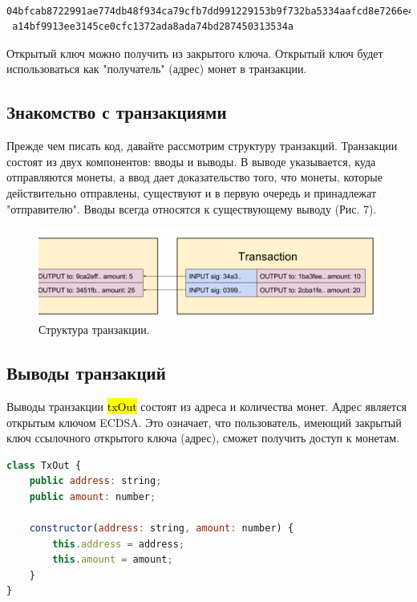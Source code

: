 \documentclass{article}
\begin{document}
\begin{lstlisting}
 04bfcab8722991ae774db48f934ca79cfb7dd991229153b9f732ba5334aafcd8e7266e47076996b55
 a14bf9913ee3145ce0cfc1372ada8ada74bd287450313534a
\end{lstlisting}

Открытый ключ можно получить из закрытого ключа. Открытый ключ будет использоваться как "получатель" (адрес) монет в транзакции.

\subsection{Знакомство с транзакциями}

Прежде чем писать код, давайте рассмотрим структуру транзакций. Транзакции состоят из двух компонентов: вводы и выводы. В выводе указывается, куда отправляются монеты, а ввод дает доказательство того, что монеты, которые действительно отправлены, существуют и в первую очередь и принадлежат "отправителю". Вводы всегда относятся к существующему выводу (Рис. 7).

\begin{figure}
	\centering
	\includegraphics[scale=0.45]{transactions}
	\caption{Структура транзакции.}
	\label{fig:transactions}
\end{figure}

\subsection{Выводы транзакций}

Выводы транзакции \hl{txOut} состоят из адреса и количества монет. Адрес является открытым ключом ECDSA. Это означает, что пользователь, имеющий закрытый ключ ссылочного открытого ключа (адрес), сможет получить доступ к монетам.

\begin{lstlisting}[language=JavaScript, caption={Класс вывода транзакции.}]
class TxOut {
	public address: string;
	public amount: number;
	
	constructor(address: string, amount: number) {
		this.address = address;
		this.amount = amount;
	}
}
\end{lstlisting}
\end{document}
